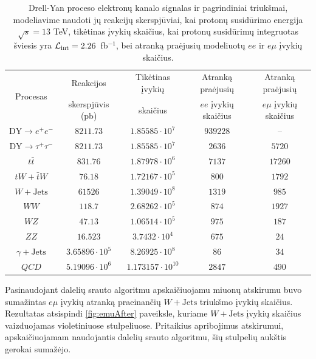 \documentclass[a4paper, 12pt]{article}
\newcommand{\WW}{W\! W}
\newcommand{\ZZ}{Z\! Z}
\newcommand{\WZ}{W\! Z}
\newcommand{\gJets}{\gamma\! +\!\mathrm{Jets}}
\newcommand{\WJets}{W\! +\!\mathrm{Jets}}
\newcommand{\dtW}{tW\! + \! \bar{t}W}
\newcommand{\Lumi}{{\cal L}_\mathrm{int}}
\newcommand{\invfb}{fb$^{-1}$}
\newcommand{\QCD}{QC\! D}
\newlength\q
\begin{document}
\vspace{-0.15cm}
\begin{centering}
\begin{table}[H]
\begin{tabular}{|c|c|c|c|c|}
\hline
\multirow{2}{*}{Procesas} & Reakcijos & Tikėtinas įvykių  & Atranką praėjusių & Atranką praėjusių\\
  &  skerspjūvis (pb) & skaičius & $ee$ įvykių skaičius & $e\mu$ įvykių skaičius \\
\hline\hline
$\mathrm{DY} \! \rightarrow \! e^{+}e^{-}$ & $8211.73$ & $1.85585\cdot 10^{7}$ & $939228$ & -- \\
\hline
$\mathrm{DY} \! \rightarrow \! \tau^{+} \tau^{-}$ & $8211.73$ & $1.85585\cdot 10^{7}$ & $2636$ & $5720$ \\
\hline
$t\bar{t}$ & $831.76$ & $1.87978\cdot 10^{6}$ & $7137$ & $17260$ \\
\hline
$\dtW$ & $76.18$ & $1.72167\cdot 10^{5}$ & $800$ & $1792$ \\
\hline
$\WJets$ & $61526$ & $1.39049\cdot 10^{8}$ & $1319$ & $985$ \\
\hline
$\WW$ & $118.7$ & $2.68262\cdot 10^{5}$ & $874$ & $1927$ \\
\hline
$\WZ$ & $47.13$ & $1.06514\cdot 10^{5}$ & $975$ & $187$ \\
\hline
$\ZZ$ & $16.523$ & $3.7432\cdot 10^{4}$ & $675$ & $24$ \\
\hline
$\gJets$ & $3.65896\cdot 10^{5}$ & $8.26925\cdot 10^{8}$ & $86$ & $34$ \\
\hline
$\QCD$ & $5.19096\cdot 10^{6}$ & $1.173157\cdot 10^{10}$ & $2847$ & $490$ \\
\hline
\end{tabular}
\caption{Drell-Yan proceso elektronų kanalo signalas ir pagrindiniai triukšmai, modeliavime naudoti jų reakcijų skerspjūviai, kai protonų susidūrimo energija $\sqrt{s}=13$ TeV, tikėtinas įvykių skaičius, kai protonų susidūrimų integruotas šviesis yra $\Lumi=2.26$~\invfb, bei atranką praėjusių modeliuotų $ee$ ir $e\mu$ įvykių skaičius.}
\label{table:CrossSections}
\end{table}
\end{centering}
\vspace{-0.15cm}

Pasinaudojant dalelių srauto algoritmu apskaičiuojamu miuonų atskirumu buvo sumažintas $e\mu$ įvykių atranką praeinančių $\WJets$ triukšmo įvykių skaičius. Rezultatas atsispindi \ref{fig:emuAfter} paveiksle, kuriame $\WJets$ įvykių skaičius vaizduojamas violetiniuose stulpeliuose. Pritaikius apribojimus atskirumui, apskaičiuojamam naudojantis dalelių srauto algoritmu, šių stulpelių aukštis gerokai sumažėjo.
\end{document}
